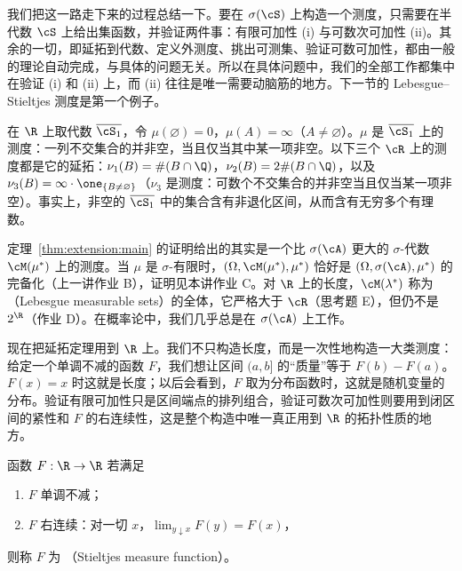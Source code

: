 \begin{remark}
我们把这一路走下来的过程总结一下。要在 $\sigma(\cS)$ 上构造一个测度，只需要在半代数 $\cS$ 上给出集函数，并验证两件事：有限可加性 (i) 与可数次可加性 (ii)。其余的一切，即延拓到代数、定义外测度、挑出可测集、验证可数可加性，都由一般的理论自动完成，与具体的问题无关。所以在具体问题中，我们的全部工作都集中在验证 (i) 和 (ii) 上，而 (ii) 往往是唯一需要动脑筋的地方。下一节的 Lebesgue--Stieltjes 测度是第一个例子。
\end{remark}

\begin{example}
在 $\R$ 上取代数 $\overline{\cS_1}$，令 $\mu(\varnothing)=0$，$\mu(A)=\infty$（$A\neq\varnothing$）。$\mu$ 是 $\overline{\cS_1}$ 上的测度：一列不交集合的并非空，当且仅当其中某一项非空。以下三个 $\cR$ 上的测度都是它的延拓：$\nu_1(B)=\#(B\cap\Q)$，$\nu_2(B)=2\#(B\cap\Q)$，以及 $\nu_3(B)=\infty\cdot\one_{\{B\neq\varnothing\}}$（$\nu_3$ 是测度：可数个不交集合的并非空当且仅当某一项非空）。事实上，非空的 $\overline{\cS_1}$ 中的集合含有非退化区间，从而含有无穷多个有理数。
\end{example}

\begin{remark}
定理~\ref{thm:extension:main} 的证明给出的其实是一个比 $\sigma(\cA)$ 更大的 $\sigma$-代数 $\cM(\mu^*)$ 上的测度。当 $\mu$ 是 $\sigma$-有限时，$(\Omega,\cM(\mu^*),\mu^*)$ 恰好是 $(\Omega,\sigma(\cA),\mu^*)$ 的完备化（上一讲作业 B），证明见本讲作业 C。对 $\R$ 上的长度，$\cM(\lambda^*)$ 称为 （Lebesgue measurable sets）的全体，它严格大于 $\cR$（思考题 E），但仍不是 $2^\R$（作业 D）。在概率论中，我们几乎总是在 $\sigma(\cA)$ 上工作。
\end{remark}


现在把延拓定理用到 $\R$ 上。我们不只构造长度，而是一次性地构造一大类测度：给定一个单调不减的函数 $F$，我们想让区间 $(a,b]$ 的“质量”等于 $F(b)-F(a)$。$F(x)=x$ 时这就是长度；以后会看到，$F$ 取为分布函数时，这就是随机变量的分布。验证有限可加性只是区间端点的排列组合，验证可数次可加性则要用到闭区间的紧性和 $F$ 的右连续性，这是整个构造中唯一真正用到 $\R$ 的拓扑性质的地方。

\begin{definition}\label{def:extension:stieltjes}
函数 $F:\R\to\R$ 若满足
\begin{enumerate}
\item $F$ 单调不减；
\item $F$ 右连续：对一切 $x$，$\lim_{y\downarrow x}F(y)=F(x)$，
\end{enumerate}
则称 $F$ 为 （Stieltjes measure function）。
\end{definition}

